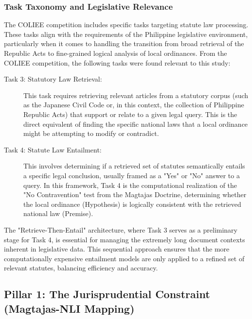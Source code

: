     \subsubsection{Task Taxonomy and Legislative Relevance}
    The COLIEE competition includes specific tasks targeting statute law processing. These tasks align with the requirements of the Philippine legislative environment, particularly when it comes to handling the transition from broad retrieval of the Republic Acts to fine-grained logical analysis of local ordinances. From the COLIEE competition, the following tasks were found relevant to this study:

    \begin{description}
        \item[Task 3: Statutory Law Retrieval:] This task requires retrieving relevant articles from a statutory corpus (such as the Japanese Civil Code or, in this context, the collection of Philippine Republic Acts) that support or relate to a given legal query. This is the direct equivalent of finding the specific national laws that a local ordinance might be attempting to modify or contradict.
        
        \item[Task 4: Statute Law Entailment:] This involves determining if a retrieved set of statutes semantically entails a specific legal conclusion, usually framed as a "Yes" or "No" answer to a query. In this framework, Task 4 is the computational realization of the "No Contravention" test from the Magtajas Doctrine, determining whether the local ordinance (Hypothesis) is logically consistent with the retrieved national law (Premise).
    \end{description}
    
    The "Retrieve-Then-Entail" architecture, where Task 3 serves as a preliminary stage for Task 4, is essential for managing the extremely long document contexts inherent in legislative data. This sequential approach ensures that the more computationally expensive entailment models are only applied to a refined set of relevant statutes, balancing efficiency and accuracy.

\subsection{Pillar 1: The Jurisprudential Constraint (Magtajas-NLI Mapping)}

